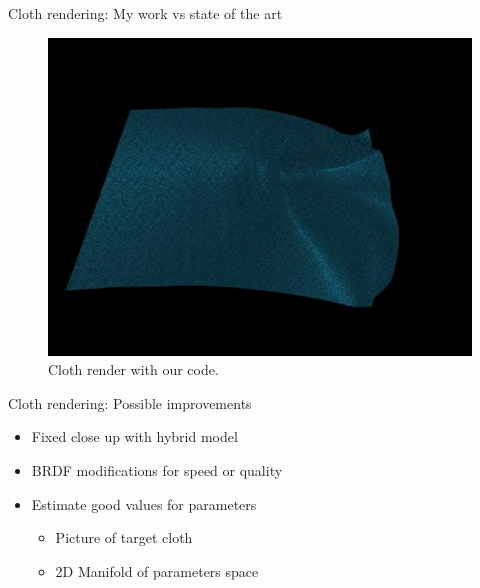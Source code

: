 \documentclass{beamer}
\begin{document}
\begin{frame}{Cloth rendering: My work vs state of the art}
\begin{figure}[!htb]
\begin{minipage}{.5\textwidth}
        \includegraphics[width=\textwidth]{img/cloth_render}
        \caption*{Cloth render with our code.}
    \end{minipage}%
\end{figure}
\end{frame}

\begin{frame}{Cloth rendering: Possible improvements}
\begin{itemize}
\setlength\itemsep{0.5em}
\item Fixed close up with hybrid model
\item BRDF modifications for speed or quality
\item Estimate good values for parameters
	\begin{itemize}
	\item Picture of target cloth
	\item 2D Manifold of parameters space 
	\end{itemize}		
\end{itemize}
\end{frame}
\end{document}
